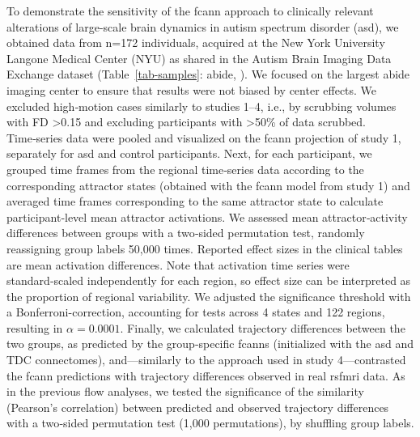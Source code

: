 \documentclass{article}
\begin{document}
To demonstrate the sensitivity of the \acrshort{fcann} approach to clinically relevant alterations of large-scale brain dynamics in autism spectrum disorder (\acrshort{asd}), we obtained data from n=172 individuals, acquired at the New York University Langone Medical Center (NYU) as shared in the Autism Brain Imaging Data Exchange dataset (Table~\ref{tab-samples}: \acrshort{abide}, \citep{di2014autism}). We focused on the largest \acrshort{abide} imaging center to ensure that results were not biased by center effects. We excluded high‑motion cases similarly to studies 1--4, i.e., by scrubbing volumes with FD \textgreater  0.15 and excluding participants with \textgreater 50\% of data scrubbed. Time‑series data were pooled and visualized on the \acrshort{fcann} projection of study 1, separately for \acrshort{asd} and control participants.
Next, for each participant, we grouped time frames from the regional time‑series data according to the corresponding attractor states (obtained with the \acrshort{fcann} model from study 1) and averaged time frames corresponding to the same attractor state to calculate participant‑level mean attractor activations.
We assessed mean attractor‑activity differences between groups with a two‑sided permutation test, randomly reassigning group labels 50,000 times. Reported effect sizes in the clinical tables are mean activation differences. Note that activation time series were standard‑scaled independently for each region, so effect size can be interpreted as the proportion of regional variability.
We adjusted the significance threshold with a Bonferroni-correction, accounting for tests across 4 states and 122 regions, resulting in $\alpha = 0.0001$.
Finally, we calculated trajectory differences between the two groups, as predicted by the group‑specific \acrshort{fcann}s (initialized with the \acrshort{asd} and TDC connectomes), and---similarly to the approach used in study 4---contrasted the \acrshort{fcann} predictions with trajectory differences observed in real rs\acrshort{fmri} data. As in the previous flow analyses, we tested the significance of the similarity (Pearson's correlation) between predicted and observed trajectory differences with a two‑sided permutation test (1,000 permutations), by shuffling group labels.
\printglossaries






\end{document}
